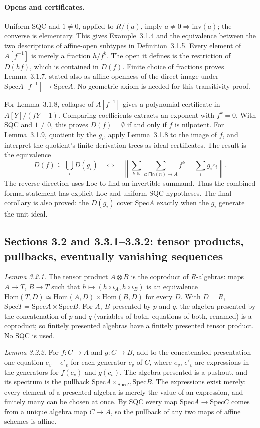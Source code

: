 \documentclass[11pt]{article}
\newcommand{\Spec}{\mathrm{Spec}}
\theoremstyle{remark}
\begin{document}
\paragraph{Opens and certificates.}
Uniform SQC and $1\ne0$, applied to $R/(a)$, imply
$a\ne0\Rightarrow\mathrm{inv}(a)$; the converse is elementary.
This gives Example~3.1.4 and the equivalence between the two descriptions
of affine-open subtypes in Definition~3.1.5.
Every element of $A[f^{-1}]$ is merely a fraction $h/f^k$.
The open it defines is the restriction of $D(hf)$, which is contained
in $D(f)$. Finite choice of fractions proves Lemma~3.1.7, stated also
as affine-openness of the direct image under
$\Spec A[f^{-1}]\to\Spec A$. No geometric axiom is needed for this
transitivity proof.

For Lemma~3.1.8, collapse of $A[f^{-1}]$ gives a polynomial certificate
in $A[Y]/(fY-1)$. Comparing coefficients extracts an exponent with
$f^k=0$. With SQC and $1\ne0$, this proves
$D(f)=\emptyset$ if and only if $f$ is nilpotent.
For Lemma~3.1.9, quotient by the $g_i$, apply Lemma~3.1.8 to the
image of $f$, and interpret the quotient's finite derivation trees as
ideal certificates. The result is the equivalence
\[
 D(f)\subseteq\bigcup_i D(g_i)
 \quad\Longleftrightarrow\quad
 \left\lVert\sum_{k:\mathbb N}\sum_{c:\mathsf{Fin}(n)\to A}
       f^k=\sum_i g_i c_i\right\rVert .
\]
The reverse direction uses Loc to find an invertible summand.
Thus the combined formal statement has explicit Loc and uniform SQC
hypotheses. The final corollary is also proved: the $D(g_i)$ cover
$\Spec A$ exactly when the $g_i$ generate the unit ideal.

\subsection*{Sections 3.2 and 3.3.1--3.3.2: tensor products, pullbacks, eventually vanishing sequences}

\emph{Lemma 3.2.1.} The tensor product $A\otimes B$ is the coproduct of
$R$-algebras: maps $A\to T$, $B\to T$ such that $h\mapsto(h\circ
\iota_A,h\circ\iota_B)$ is an equivalence $\mathrm{Hom}(T,D)\simeq
\mathrm{Hom}(A,D)\times\mathrm{Hom}(B,D)$ for every $D$. With $D=R$,
$\Spec T=\Spec A\times\Spec B$. For $A$, $B$ presented by $p$ and $q$,
the algebra presented by the concatenation of $p$ and $q$ (variables of
both, equations of both, renamed) is a coproduct; so finitely presented
algebras have a finitely presented tensor product. No SQC is used.

\emph{Lemma 3.2.2.} For $f:C\to A$ and $g:C\to B$, add to the
concatenated presentation one equation $e_v-e'_v$ for each generator $c_v$
of $C$, where $e_v$, $e'_v$ are expressions in the generators for
$f(c_v)$ and $g(c_v)$. The algebra presented is a pushout, and its
spectrum is the pullback $\Spec A\times_{\Spec C}\Spec B$. The
expressions exist merely: every element of a presented algebra is merely
the value of an expression, and finitely many can be chosen at once. By
SQC every map $\Spec A\to\Spec C$ comes from a unique algebra map
$C\to A$, so the pullback of any two maps of affine schemes is affine.
\end{document}
